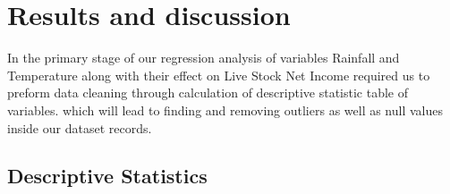 \documentclass[12pt, a4]{article}
\begin{document}
\section{Results and discussion}

In the primary stage of our regression analysis of variables Rainfall and Temperature along with their 	effect on Live Stock Net Income required us to preform data cleaning through calculation of descriptive statistic table of variables. which will lead to finding and removing outliers as well as null values inside our dataset records.
\newpage

\subsection{Descriptive Statistics}
\end{document}
